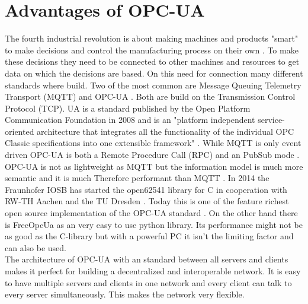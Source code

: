 \documentclass[conference]{IEEEtran}
\begin{document}
\section{Advantages of OPC-UA}
The fourth industrial revolution is about making machines and products "smart" to make decisions and control the manufacturing process on their own \cite{Industry4}.
To make these decisions they need to be connected to other machines and resources to get data on which the decisions are based.
On this need for connection many different standards where build.
Two of the most common are Message Queuing Telemetry Transport (MQTT) and OPC-UA \cite{CommTechnology}.
Both are build on the Transmission Control Protocol (TCP).
UA is a standard published by the Open Platform Communication Foundation in 2008 and is an "platform independent service-oriented architecture that integrates all the functionality of the individual OPC Classic specifications into one extensible framework" \cite{OPCUA}.
While MQTT is only event driven OPC-UA is both a Remote Procedure Call (RPC) and an PubSub mode \cite{OPCUA}. 
OPC-UA is not as lightweight as MQTT but the information model is much more semantic and it is much Therefore performant than MQTT \cite{CommunicationCommarison}.
In 2014 the Fraunhofer IOSB has started the open62541 library for C in cooperation with RW-TH Aachen and the TU Dresden \cite{open62541}.
Today this is one of the feature richest open source implementation of the OPC-UA standard \cite{ComparOPCUAPaper}.
On the other hand there is FreeOpcUa as an very easy to use python library.
Its performance might not be as good as the C-library but with a powerful PC it isn't the limiting factor and can also be used.\\
The architecture of OPC-UA with an standard between all servers and clients makes it perfect for building a decentralized and interoperable network.
It is easy to have multiple servers and clients in one network and every client can talk to every server simultaneously.
This makes the network very flexible.
\end{document}
